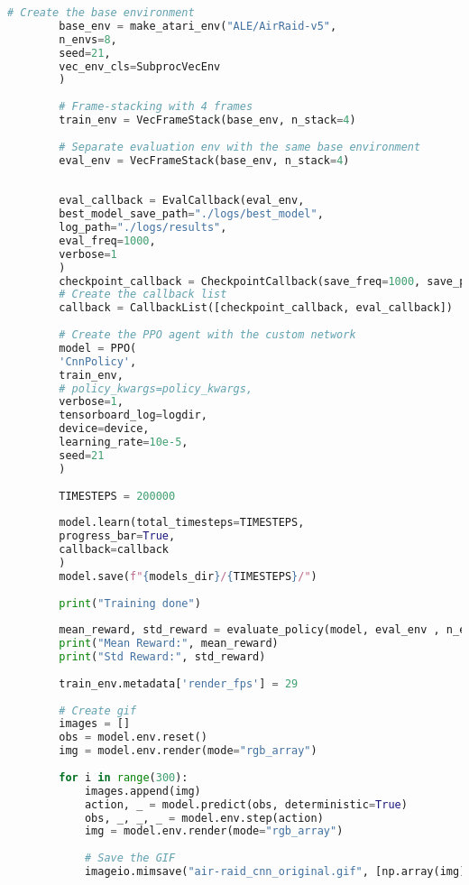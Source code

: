 \begin{lstlisting}[language=Python, caption=Code of PPO algorithm,label={lst:l3}]
		# Create the base environment
		base_env = make_atari_env("ALE/AirRaid-v5",
		n_envs=8,
		seed=21,
		vec_env_cls=SubprocVecEnv
		)
		
		# Frame-stacking with 4 frames
		train_env = VecFrameStack(base_env, n_stack=4)
		
		# Separate evaluation env with the same base environment
		eval_env = VecFrameStack(base_env, n_stack=4)
		
		
		eval_callback = EvalCallback(eval_env, 
		best_model_save_path="./logs/best_model", 
		log_path="./logs/results", 
		eval_freq=1000, 
		verbose=1
		)
		checkpoint_callback = CheckpointCallback(save_freq=1000, save_path="./logs/")
		# Create the callback list
		callback = CallbackList([checkpoint_callback, eval_callback])
		
		# Create the PPO agent with the custom network
		model = PPO(
		'CnnPolicy',
		train_env,
		# policy_kwargs=policy_kwargs,
		verbose=1,
		tensorboard_log=logdir,
		device=device,
		learning_rate=10e-5,
		seed=21
		)
		
		TIMESTEPS = 200000
		
		model.learn(total_timesteps=TIMESTEPS,
		progress_bar=True, 
		callback=callback
		)
		model.save(f"{models_dir}/{TIMESTEPS}/")
		
		print("Training done")
		
		mean_reward, std_reward = evaluate_policy(model, eval_env , n_eval_episodes=10)
		print("Mean Reward:", mean_reward)
		print("Std Reward:", std_reward)
		
		train_env.metadata['render_fps'] = 29
		
		# Create gif
		images = []
		obs = model.env.reset()
		img = model.env.render(mode="rgb_array")
		
		for i in range(300):
			images.append(img)
			action, _ = model.predict(obs, deterministic=True)
			obs, _, _, _ = model.env.step(action)
			img = model.env.render(mode="rgb_array")
			
			# Save the GIF
			imageio.mimsave("air-raid_cnn_original.gif", [np.array(img) for i, img in enumerate(images) if i % 2 == 0], duration=500)
		
	
\end{lstlisting}


